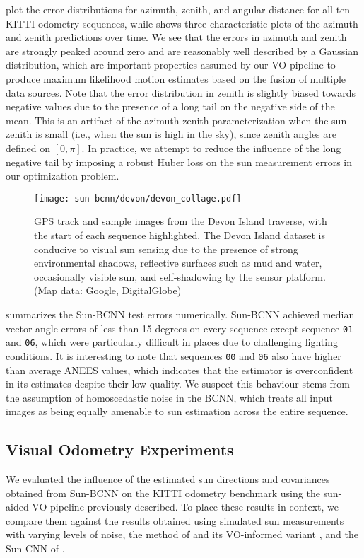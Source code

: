  plot the error distributions for azimuth, zenith, and angular distance for all ten KITTI odometry sequences, while  shows three characteristic plots of the azimuth and zenith predictions over time. 
We see that the errors in azimuth and zenith are strongly peaked around zero and are reasonably well described by a Gaussian distribution, which are important properties assumed by our VO pipeline to produce maximum likelihood motion estimates based on the fusion of multiple data sources.
Note that the error distribution in zenith is slightly biased towards negative values due to the presence of a long tail on the negative side of the mean.
This is an artifact of the azimuth-zenith parameterization when the sun zenith is small (i.e., when the sun is high in the sky), since zenith angles are defined on $[0,\pi]$.
In practice, we attempt to reduce the influence of the long negative tail by imposing a robust Huber loss on the sun measurement errors in our optimization problem.

\begin{figure*}[ht!]
	\centering
	\texttt{[image: sun-bcnn/devon/devon\_collage.pdf]}	
	\caption{GPS track and sample images from the Devon Island traverse, with the start of each sequence highlighted. The Devon Island dataset is conducive to visual sun sensing due to the presence of strong environmental shadows, reflective surfaces such as mud and water, occasionally visible sun, and self-shadowing by the sensor platform. (Map data: Google, DigitalGlobe)}
	\label{fig:devon_collage}
\end{figure*}

 summarizes the Sun-BCNN test errors numerically.
Sun-BCNN achieved median vector angle errors of less than 15 degrees on every sequence except sequence \texttt{01} and \texttt{06}, which were particularly difficult in places due to challenging lighting conditions.
It is interesting to note that sequences \texttt{00} and \texttt{06} also have higher than average ANEES values, which indicates that the estimator is overconfident in its estimates despite their low quality.
We suspect this behaviour stems from the assumption of homoscedastic noise in the BCNN, which treats all input images as being equally amenable to sun estimation across the entire sequence.

\subsection{Visual Odometry Experiments}
We evaluated the influence of the estimated sun directions and covariances obtained from Sun-BCNN on the KITTI odometry benchmark using the sun-aided VO pipeline previously described.
To place these results in context, we compare them against the results obtained using simulated sun measurements with varying levels of noise, the method of \citet{Lalonde2011-jw} and its VO-informed variant \citep{Clement2016-ir}, and the Sun-CNN of \citet{Ma2016-at}.

